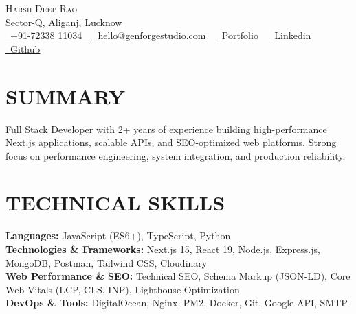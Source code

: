 \documentclass[letterpaper,11pt]{article}
\begin{document}
\begin{center}
    {\Huge \scshape Harsh Deep Rao} \\ 
     Sector-Q, Aliganj, Lucknow \\ 
    \small \href{tel:+917233811034}{ \raisebox{-0.1\height}\faPhone\ \underline{+91-72338 11034} ~} \href{mailto:hello@genforgestudio.com}{\raisebox{-0.2\height}\faEnvelope\  \underline{hello@genforgestudio.com}} ~ 
    \href{https://my-portfolio-2026-nu.vercel.app/}{\raisebox{-0.2\height}\faGlobe\ \underline{Portfolio}} ~
    \href{https://www.linkedin.com/in/harsh-d-rao/}{\raisebox{-0.2\height}\faLinkedinSquare\ \underline{Linkedin}}  ~
    \href{https://github.com/harshrao26}{\raisebox{-0.2\height}\faGithub\ \underline{Github}}
\end{center}
\vspace{-18pt}


\section*{SUMMARY}
\small{Full Stack Developer with 2+ years of experience building high-performance Next.js applications, scalable APIs, and SEO-optimized web platforms. Strong focus on performance engineering, system integration, and production reliability.}





\section{TECHNICAL SKILLS}
\vspace{-2pt}
 \begin{itemize}[leftmargin=0.15in, label={}]
    \small{\item{
     \textbf{\normalsize{Languages:}}{ \normalsize{JavaScript (ES6+), TypeScript, Python}} \\
     \textbf{\normalsize{Technologies \& Frameworks:}}{ \normalsize{Next.js 15, React 19, Node.js, Express.js, MongoDB, Postman, Tailwind CSS, Cloudinary}} \\
     \textbf{\normalsize{Web Performance \& SEO:}}{ \normalsize{Technical SEO, Schema Markup (JSON-LD), Core Web Vitals (LCP, CLS, INP), Lighthouse Optimization}} \\
     \textbf{\normalsize{DevOps \& Tools:}}{ \normalsize{DigitalOcean, Nginx, PM2, Docker, Git, Google API, SMTP}} \\
    }}
 \end{itemize}
 \vspace{-8pt}
\end{document}
